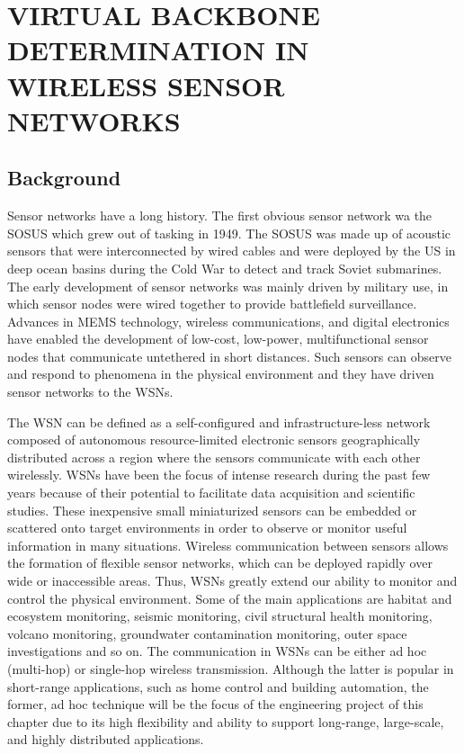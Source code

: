 \chapter{VIRTUAL BACKBONE DETERMINATION IN WIRELESS SENSOR NETWORKS} \label{ch:WSN}%

\section{Background} \label{sec:background} %

Sensor networks have a long history. The first obvious sensor network wa the \ac{SOSUS} which grew out of tasking in 1949\cite{whitman2005sosus,chong2003sensor}. The \ac{SOSUS} was made up of acoustic sensors that were interconnected by wired cables and were deployed by the US in deep ocean basins during the Cold War to detect and track Soviet submarines. The early development of sensor networks was mainly driven by military use, in which sensor nodes were wired together to provide battlefield surveillance. Advances in \ac{MEMS} technology, wireless communications, and digital electronics have enabled the development of low-cost, low-power, multifunctional sensor nodes that communicate untethered in short distances\cite{akyildiz2002wireless}. Such sensors can observe and respond to phenomena in the physical environment and they have driven sensor networks to the \acp{WSN}.

The \ac{WSN} can be defined as a self-configured and infrastructure-less network composed of autonomous resource-limited electronic sensors geographically distributed across a region where the sensors communicate with each other wirelessly\cite{carlos2016wireless,saibharath2014virtual}. \acp{WSN} have been the focus of intense research during the past few years because of their potential to facilitate data acquisition and scientific studies\cite{werner2006deploying}. These inexpensive small miniaturized sensors can be embedded or scattered onto target environments in order to observe or monitor useful information in many situations. Wireless communication between sensors allows the formation of flexible sensor networks, which can be deployed rapidly over wide or inaccessible areas. Thus, \acp{WSN} greatly extend our ability to monitor and control the physical environment. Some of the main applications are habitat and ecosystem monitoring, seismic monitoring, civil structural health monitoring, volcano monitoring, groundwater contamination monitoring, outer space investigations and so on\cite{senniappan2016application,werner2006deploying,prasad2011wireless,hong2002load,xue2010two}.  The communication in \acp{WSN} can be either ad hoc (multi-hop) or single-hop wireless transmission\cite{akyildiz2002wireless,meghji2011transmission,singh2015design}. Although the latter is popular in short-range applications, such as home control and building automation, the former, ad hoc technique will be the focus of the engineering project of this chapter due to its high flexibility and ability to support long-range, large-scale, and highly distributed applications\cite{singh2015design}.

